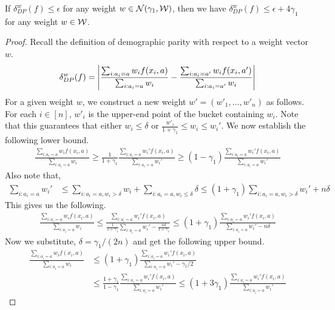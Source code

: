 
\begin{lemma}
If $\delta^w_{DP}(f) \le \epsilon$ for any weight $w \in \mathcal{N}(\gamma_1,\mathcal{W})$, then we have $\delta^w_{DP}(f) \le \epsilon + 4\gamma_1$ for any weight $w \in \mathcal{W}$.
\end{lemma}
\begin{proof}
Recall the definition of demographic parity with respect to a weight vector $w$.
$$\delta^w_{DP}(f) = \left| \frac{\sum_{i: a_i = a} w_i f(x_i,a)}{\sum_{i: a_i = a} w_i} -  \frac{\sum_{i: a_i = a'} w_i f(x_i,a')}{{\sum_{i: a_i = a'} w_i}} \right|$$ 
For a given weight $w$, we construct a new weight $w' = (w'_1,\ldots,w'_n)$ as follows. For each $i \in [n]$, $w'_i$ is the upper-end point of the bucket containing $w_i$. Note that this guarantees that either $w_i\le \delta$ or $\frac{w'_i}{1+\gamma_1} \le w_i \le w_i'$. We now establish the following lower bound.
\begin{align}\label{eq:lbd-ratio}
\frac{\sum_{i: a_i = a} w_i f(x_i,a)}{\sum_{i: a_i = a} w_i} \ge \frac{1}{1+\gamma_1}  \frac{\sum_{i: a_i = a} w_i' f(x_i,a)}{\sum_{i: a_i = a} w_i'} \ge (1-\gamma_1) \frac{\sum_{i: a_i = a} w_i' f(x_i,a)}{\sum_{i: a_i = a} w_i'} 
\end{align}
Also note that,
\begin{align*}
\sum_{i: a_i = a} w_i' &\le \sum_{i:a_i = a, w_i > \delta} w_i + \sum_{i: a_i = a, w_i \le \delta} \delta 
\le (1+\gamma_1) \sum_{i:a_i = a, w_i > \delta} w_i' + n \delta
\end{align*}
This gives us the following.
\begin{align*}
\frac{\sum_{i: a_i = a} w_i f(x_i,a)}{\sum_{i: a_i = a} w_i} \le \frac{\sum_{i: a_i = a} w_i' f(x_i,a)}{\frac{1}{1+\gamma_1}\sum_{i: a_i = a} w_i' - \frac{n\delta}{1+\gamma_1} }  \le (1+\gamma_1) \frac{\sum_{i: a_i = a} w_i' f(x_i,a)}{\sum_{i: a_i = a} w_i' - n\delta } 
\end{align*}
Now we substitute, $\delta=\gamma_1/(2n)$ and get the following upper bound.
\begin{align}%
\frac{\sum_{i: a_i = a} w_i f(x_i,a)}{\sum_{i: a_i = a} w_i} &\le (1+\gamma_1) \frac{\sum_{i: a_i = a} w_i' f(x_i,a)}{\sum_{i: a_i = a} w_i' - \gamma_1/2}\nonumber \\ &\le \frac{1+\gamma_1}{1-\gamma_1} \frac{\sum_{i: a_i = a} w_i' f(x_i,a)}{\sum_{i: a_i = a} w_i'} \le (1+3\gamma_1)  \frac{\sum_{i: a_i = a} w_i' f(x_i,a)}{\sum_{i: a_i = a} w_i'}\label{eq:ubd-ratio}
\end{align}

\end{proof}
